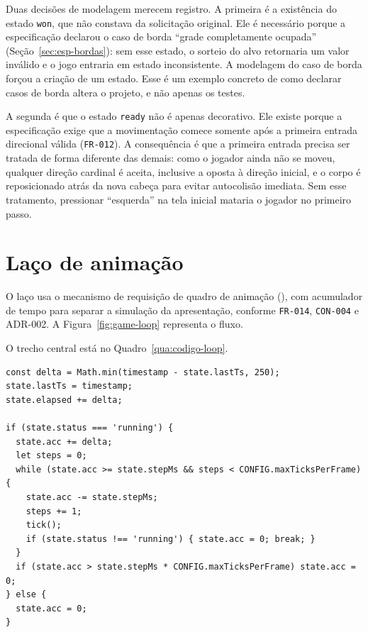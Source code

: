 

Duas decisões de modelagem merecem registro. A primeira é a existência do estado
\texttt{won}, que não constava da solicitação original. Ele é necessário porque a
especificação declarou o caso de borda ``grade completamente ocupada''
(Seção~\ref{sec:esp-bordas}): sem esse estado, o sorteio do alvo retornaria um
valor inválido e o jogo entraria em estado inconsistente. A modelagem do caso de
borda forçou a criação de um estado. Esse é um exemplo concreto de como declarar
casos de borda altera o projeto, e não apenas os testes.

A segunda é que o estado \texttt{ready} não é apenas decorativo. Ele existe
porque a especificação exige que a movimentação comece somente após a primeira
entrada direcional válida (\texttt{FR-012}). A consequência é que a primeira
entrada precisa ser tratada de forma diferente das demais: como o jogador ainda
não se moveu, qualquer direção cardinal é aceita, inclusive a oposta à direção
inicial, e o corpo é reposicionado atrás da nova cabeça para evitar autocolisão
imediata. Sem esse tratamento, pressionar ``esquerda'' na tela inicial mataria o
jogador no primeiro passo.

\section{Laço de animação}
\label{sec:impl-loop}

O laço usa o mecanismo de requisição de quadro de animação
(), com acumulador de tempo para separar a simulação da
apresentação, conforme \texttt{FR-014}, \texttt{CON-004} e ADR-002. A
Figura~\ref{fig:game-loop} representa o fluxo.



O trecho central está no Quadro~\ref{qua:codigo-loop}.

\begin{quadro}[htb]
	\caption{Trecho do laço de animação: acúmulo de tempo e execução de passos (excertado)}
	\label{qua:codigo-loop}
	\begin{lstlisting}[style=codigo]
const delta = Math.min(timestamp - state.lastTs, 250);
state.lastTs = timestamp;
state.elapsed += delta;

if (state.status === 'running') {
  state.acc += delta;
  let steps = 0;
  while (state.acc >= state.stepMs && steps < CONFIG.maxTicksPerFrame) {
    state.acc -= state.stepMs;
    steps += 1;
    tick();
    if (state.status !== 'running') { state.acc = 0; break; }
  }
  if (state.acc > state.stepMs * CONFIG.maxTicksPerFrame) state.acc = 0;
} else {
  state.acc = 0;
}
	\end{lstlisting}
\end{quadro}

